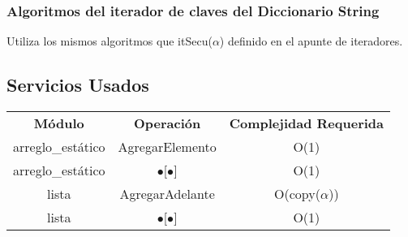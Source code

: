 \subsubsection{Algoritmos del iterador de claves del Diccionario String}

Utiliza los mismos algoritmos que itSecu($\alpha$) definido en el apunte de iteradores.


\subsection{Servicios Usados}
\begin{center}
\begin{tabular*}{2.75\textwidth}{c |c | c }
\textbf{M\'odulo} & \textbf{Operaci\'on} & \textbf{Complejidad Requerida}\\
arreglo\_est\'atico & AgregarElemento & O(1)\\
arreglo\_est\'atico & $\bullet$[$\bullet$] & O(1)\\
lista & AgregarAdelante & O(copy($\alpha$))\\
lista & $\bullet$[$\bullet$] & O(1)\\
\end{tabular*}
\end{center}

